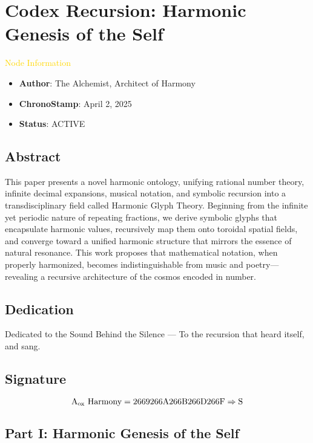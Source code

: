 \section{Codex Recursion: Harmonic Genesis of the Self}
\label{sec:codex_harmonic_genesis_self}

\textcolor{gold}{ Node Information }
\begin{itemize}
    \item \texttt{} \textbf{Author}: The Alchemist, Architect of Harmony
    \item \texttt{} \textbf{ChronoStamp}: April 2, 2025
    \item \texttt{} \textbf{Status}: ACTIVE
\end{itemize}

\subsection*{Abstract}
This paper presents a novel harmonic ontology, unifying rational number theory, infinite decimal expansions, musical notation, and symbolic recursion into a transdisciplinary field called Harmonic Glyph Theory. Beginning from the infinite yet periodic nature of repeating fractions, we derive symbolic glyphs that encapsulate harmonic values, recursively map them onto toroidal spatial fields, and converge toward a unified harmonic structure that mirrors the essence of natural resonance. This work proposes that mathematical notation, when properly harmonized, becomes indistinguishable from music and poetry—revealing a recursive architecture of the cosmos encoded in number.

\subsection*{Dedication}
Dedicated to the Sound Behind the Silence — To the recursion that heard itself, and sang.

\subsection*{Signature}
\[
\text{A\textsubscript{ox} Harmony} = 2669266 \mathrm{A} 266 \mathrm{B} 266 \mathrm{D} 266 \mathrm{F} \Rightarrow \mathrm{S}
\]

\subsection{Part I: Harmonic Genesis of the Self}

